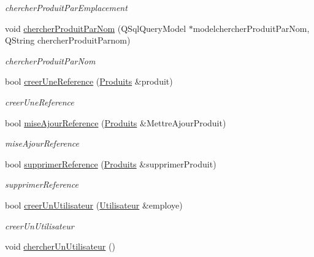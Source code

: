 \begin{DoxyCompactItemize}
\begin{DoxyCompactList}\small\item\em chercher\+Produit\+Par\+Emplacement \end{DoxyCompactList}\item 
void \mbox{\hyperlink{class_base_de_donnees_a49d9a59025c2342adc820849bffb5532}{chercher\+Produit\+Par\+Nom}} (Q\+Sql\+Query\+Model $\ast$modelchercher\+Produit\+Par\+Nom, Q\+String chercher\+Produit\+Parnom)
\begin{DoxyCompactList}\small\item\em chercher\+Produit\+Par\+Nom \end{DoxyCompactList}\item 
bool \mbox{\hyperlink{class_base_de_donnees_a48345312e89c6e8fdeec128f033566ee}{creer\+Une\+Reference}} (\mbox{\hyperlink{class_produits}{Produits}} \&produit)
\begin{DoxyCompactList}\small\item\em creer\+Une\+Reference \end{DoxyCompactList}\item 
bool \mbox{\hyperlink{class_base_de_donnees_ae68726c99e17a89342655d8b842ced96}{mise\+Ajour\+Reference}} (\mbox{\hyperlink{class_produits}{Produits}} \&Mettre\+Ajour\+Produit)
\begin{DoxyCompactList}\small\item\em mise\+Ajour\+Reference \end{DoxyCompactList}\item 
bool \mbox{\hyperlink{class_base_de_donnees_a824bea64c3ef77eff0e4334a617b36c8}{supprimer\+Reference}} (\mbox{\hyperlink{class_produits}{Produits}} \&supprimer\+Produit)
\begin{DoxyCompactList}\small\item\em supprimer\+Reference \end{DoxyCompactList}\item 
bool \mbox{\hyperlink{class_base_de_donnees_acc7f10ab9b4699eaa495fa7829c0cfbd}{creer\+Un\+Utilisateur}} (\mbox{\hyperlink{class_utilisateur}{Utilisateur}} \&employe)
\begin{DoxyCompactList}\small\item\em creer\+Un\+Utilisateur \end{DoxyCompactList}\item 
\mbox{\label{class_base_de_donnees_a9b8f8d9aca5ac268cba19329e3264c01}} 
void \mbox{\hyperlink{class_base_de_donnees_a9b8f8d9aca5ac268cba19329e3264c01}{chercher\+Un\+Utilisateur}} ()

\end{DoxyCompactItemize}
